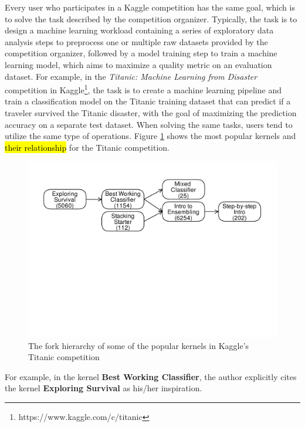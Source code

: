 Every user who participates in a Kaggle competition has the same goal, which is to solve the task described by the competition organizer.
Typically, the task is to design a machine learning workload containing a series of exploratory data analysis steps to preprocess one or multiple raw datasets provided by the competition organizer, followed by a model training step to train a machine learning model, which aims to maximize a quality metric on an evaluation dataset.
For example, in the \textit{Titanic: Machine Learning from Disaster} competition in Kaggle\footnote{https://www.kaggle.com/c/titanic}, the task is to create a machine learning pipeline and train a classification model on the Titanic training dataset that can predict if a traveler survived the Titanic disaster, with the goal of maximizing the prediction accuracy on a separate test dataset.
When solving the same tasks, users tend to utilize the same type of operations.
Figure \ref{fig-titanic-script-hierarchy} shows the most popular kernels and \hl{their relationship} for the Titanic competition.
\begin{figure}
\centering
\includegraphics[width=\columnwidth]{../images/kaggle-titanic-scripts-graph}
\caption{The fork hierarchy of some of the popular kernels in Kaggle's Titanic competition}
\label{fig-titanic-script-hierarchy}
\end{figure}
For example, in the kernel \textbf{Best Working Classifier}, the author explicitly cites the kernel \textbf{Exploring Survival} as his/her inspiration.
